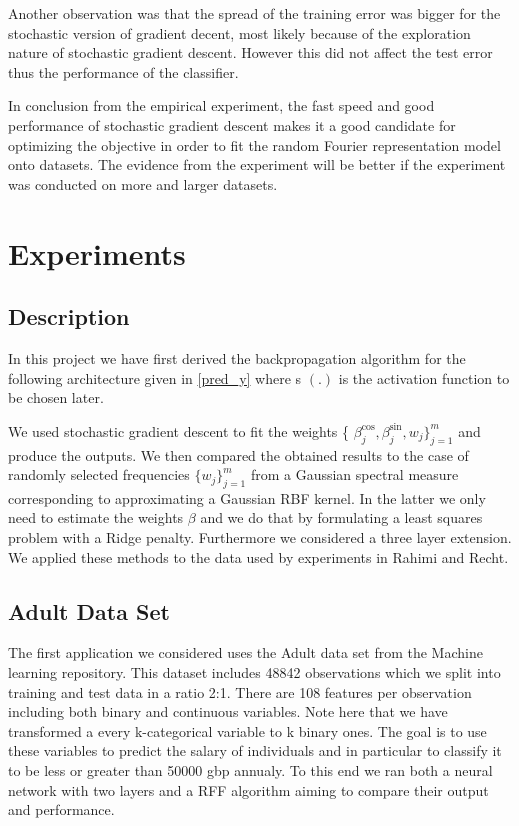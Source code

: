 \documentclass{article} %
\begin{document}
Another observation was that the spread of the training error was bigger for the stochastic version of gradient decent, most likely because of the exploration nature of stochastic gradient descent. However this did not affect the test error thus the performance of the classifier.

In conclusion from the empirical experiment, the fast speed and good performance of stochastic gradient descent makes it a good candidate for optimizing the objective in order to fit the random Fourier representation model onto datasets. The evidence from the experiment will be better if the experiment was conducted on more and larger datasets.




\section{Experiments}
\subsection{Description}
In this project we have first derived the backpropagation algorithm for the following architecture given in \eqref{pred_y}
where s $(.)$ is the activation function to be chosen later.

We used stochastic gradient descent to fit the weights \{ $\beta_{j}^{\cos}, \beta_{j}^{\sin}, w_{j} \}_{j=1}^{m}$ and produce the outputs. We then compared the obtained results to the case of randomly selected frequencies  $ \{w_{j}\}_{j=1}^{m}$ from a Gaussian spectral measure corresponding to approximating a Gaussian RBF kernel. In the latter we only need to estimate the weights $\beta$ and we do that by formulating a least squares problem with a Ridge penalty. Furthermore we considered a three layer extension. We applied these methods to the data used by experiments in Rahimi and Recht. \cite{Rahimi}

\subsection{Adult Data Set}
The first application we considered uses the Adult data set from the Machine learning repository. This dataset includes 48842 observations which we split into training and test data in a ratio 2:1. There are 108 features per observation including both binary and continuous variables. Note here that we have transformed a every k-categorical variable to k binary ones.  The goal is to use these variables to predict the salary of individuals and in particular to classify it to be less or greater than 50000 gbp annualy. To this end we ran both a neural network with two layers and a RFF algorithm aiming to compare their output and performance. 
\end{document}
